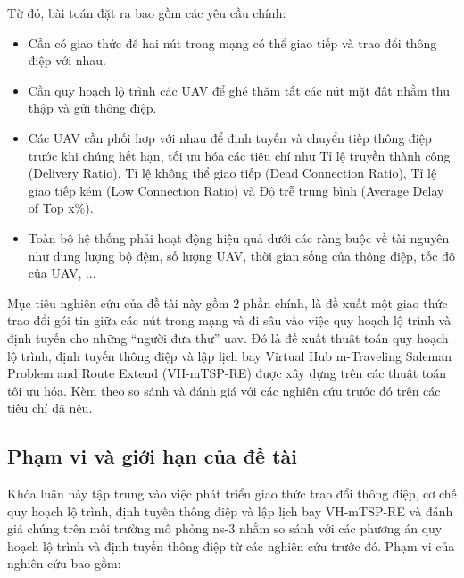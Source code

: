 \documentclass[a4paper]{article}
\begin{document}
Từ đó, bài toán đặt ra bao gồm các yêu cầu chính: 
\begin{itemize}
  \item Cần có giao thức để hai nút trong mạng có thể giao tiếp và trao đổi thông điệp với nhau.
  \item Cần quy hoạch lộ trình các UAV để ghé thăm tất các nút mặt đất nhằm thu thập và gửi thông điệp.
  \item Các UAV cần phối hợp với nhau để định tuyến và chuyển tiếp thông điệp trước khi chúng hết hạn, tối ưu hóa các tiêu chí như Tỉ lệ truyền thành công (Delivery Ratio), Tỉ lệ không thể giao tiếp (Dead Connection Ratio), Tỉ lệ giao tiếp kém (Low Connection Ratio) và Độ trễ trung bình (Average Delay of Top x\%).
  \item Toàn bộ hệ thống phải hoạt động hiệu quả dưới các ràng buộc về tài nguyên như dung lượng bộ đệm, số lượng UAV, thời gian sống của thông điệp, tốc độ của UAV, ...
\end{itemize}

Mục tiêu nghiên cứu của đề tài này gồm 2 phần chính, là đề xuất một giao thức trao đổi gói tin giữa các nút trong mạng và đi sâu vào việc quy hoạch lộ trình và định tuyến cho những ``người đưa thư'' uav. Đó là đề xuất thuật toán quy hoạch lộ trình, định tuyến thông điệp và lập lịch bay Virtual Hub m-Traveling Saleman Problem and Route Extend (VH-mTSP-RE) được xây dựng trên các thuật toán tôi ưu hóa. Kèm theo so sánh và đánh giá với các nghiên cứu trước đó trên các tiêu chí đã nêu. 

\subsection{Phạm vi và giới hạn của đề tài}
Khóa luận này tập trung vào việc phát triển giao thức trao đổi thông điệp, cơ chế quy hoạch lộ trình, định tuyến thông điệp và lập lịch bay VH-mTSP-RE và đánh giá chúng trên môi trường mô phỏng ns-3 nhằm so sánh với các phương án quy hoạch lộ trình và định tuyến thông điệp từ các nghiên cứu trước đó. Phạm vi của nghiên cứu bao gồm:
\end{document}
